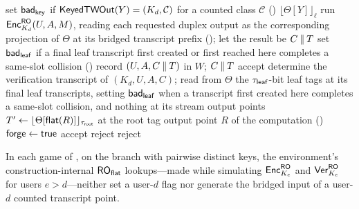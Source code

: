 \begin{algorithm}[t]
  \caption{Shared user-$d$ oracle code of the games \Greal{} and
    \Grej{} (). $\Theta$ is the shared
    lazy $\ROflat$ table, read at bridged transcript prefixes, and $W$
    the user-$d$ replay record. Inputs failing the validity or
    nonce-respecting checks of  are rejected
    beforehand, as in every game. The two games differ exactly in the
    marked lines~\ref{line:ret-real} and~\ref{line:ret-rej}.}
  \label{alg:adjacent-hybrid-games}
  \begin{algorithmic}[1]
     
      \State set $\mathsf{bad}_{\mathsf{key}}$ if $\mathsf{KeyedTWOut}(Y) = (K_d, \mathcal{C})$ for
        a counted class $\mathcal{C}$ ()
      \State \Return $\lfloor \Theta[Y] \rfloor_{\ell}$
    \EndProcedure
    \Statex
      \State run $\mathsf{Enc}_{K_d}^{\mathsf{RO}}(U, A, M)$, reading each requested
        duplex output as the corresponding projection of $\Theta$ at
        its bridged transcript prefix (); let the
        result be $C \mathbin{\|} T$
      \State set $\mathsf{bad}_{\mathsf{leaf}}$ if a final leaf transcript first created or
        first reached here completes a same-slot collision
        ()
      \State record $(U, A, C \mathbin{\|} T)$ in $W$; \Return $C \mathbin{\|} T$
    \EndProcedure
    \Statex
       \Return accept \EndIf
      \State determine the verification transcript of $(K_d, U, A, C)$;
        read from $\Theta$ the $\tau_{\mathsf{leaf}}$-bit leaf tags at its final
        leaf transcripts, setting $\mathsf{bad}_{\mathsf{leaf}}$ when a transcript first
        created here completes a same-slot collision, and nothing at its
        stream output points
      \State $T' \gets \lfloor \Theta[\mathsf{flat}(R)] \rfloor_{\tau_{\mathsf{root}}}$
        at the root tag output point $R$ of the computation
        ()
        \State $\mathsf{forge} \gets \mathsf{true}$
        \State \Return accept 
          \label{line:ret-real}
        \State \Return reject 
          \label{line:ret-rej}
      \EndIf
      \State \Return reject
    \EndProcedure
  \end{algorithmic}
\end{algorithm}

\begin{lemma}
\label{lem:env-neutrality}
In each game of , on the branch with
pairwise distinct keys, the environment's construction-internal
$\ROflat$ lookups---made while simulating $\mathsf{Enc}_{K_e}^{\mathsf{RO}}$ and
$\mathsf{Ver}_{K_e}^{\mathsf{RO}}$ for users $e > d$---neither set a user-$d$ flag nor
generate the bridged input of a user-$d$ counted transcript point.
\end{lemma}

